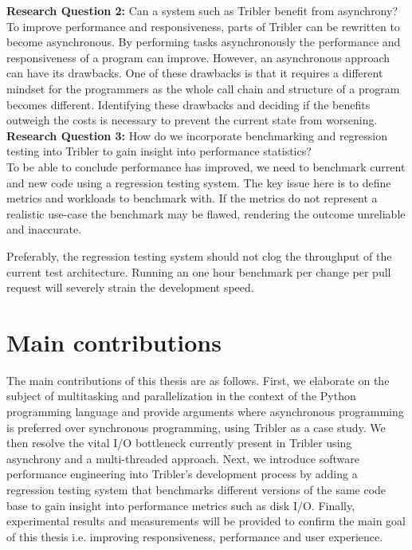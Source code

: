 \textbf{Research Question 2:} Can a system such as Tribler benefit from asynchrony?\\

To improve performance and responsiveness, parts of Tribler can be rewritten to become asynchronous.
By performing tasks asynchronously the performance and responsiveness of a program can improve.
However, an asynchronous approach can have its drawbacks. 
One of these drawbacks is that it requires a different mindset for the programmers as the whole call chain and structure of a program becomes different.
Identifying these drawbacks and deciding if the benefits outweigh the costs is necessary to prevent the current state from worsening. \\

\noindent
\textbf{Research Question 3:} How do we incorporate benchmarking and regression testing into Tribler to gain insight into performance statistics?\\

To be able to conclude performance has improved, we need to benchmark current and new code using a regression testing system.
The key issue here is to define metrics and workloads to benchmark with.
If the metrics do not represent a realistic use-case the benchmark may be flawed, rendering the outcome unreliable and inaccurate.

Preferably, the regression testing system should not clog the throughput of the current test architecture.
Running an one hour benchmark per change per pull request will severely strain the development speed.

\section{Main contributions}
The main contributions of this thesis are as follows.
First, we elaborate on the subject of multitasking and parallelization in the context of the Python programming language and provide arguments where asynchronous programming is preferred over synchronous programming, using Tribler as a case study.
We then resolve the vital I/O bottleneck currently present in Tribler using asynchrony and a multi-threaded approach.
Next, we introduce software performance engineering into Tribler's development process by adding a regression testing system that benchmarks different versions of the same code base to gain insight into performance metrics such as disk I/O.
Finally, experimental results and measurements will be provided to confirm the main goal of this thesis i.e. improving responsiveness, performance and user experience.
